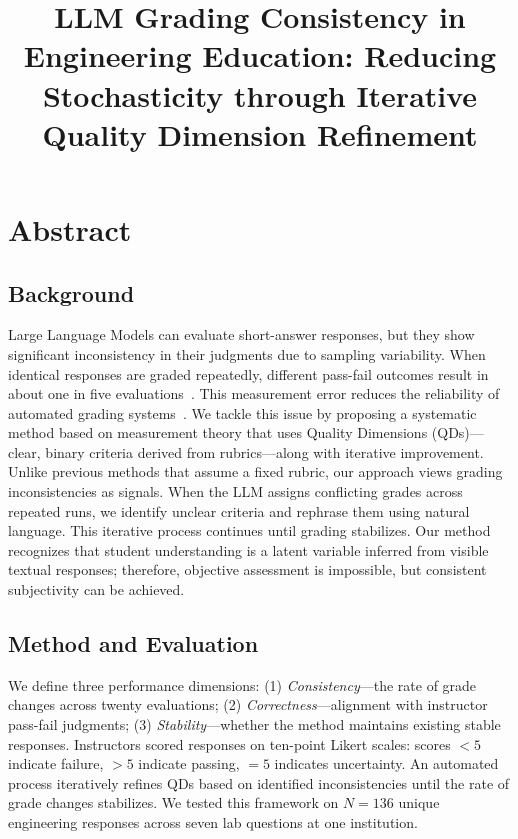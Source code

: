 \documentclass[11pt]{article}
\title{LLM Grading Consistency in Engineering Education: Reducing Stochasticity through Iterative Quality Dimension Refinement}
\author{}
\date{}
\begin{document}
\maketitle

\section*{Abstract}

\subsection*{Background}
Large Language Models can evaluate short-answer responses, but they show significant inconsistency in their judgments due to sampling variability. When identical responses are graded repeatedly, different pass-fail outcomes result in about one in five evaluations~\cite{zhang2024}. This measurement error reduces the reliability of automated grading systems~\cite{grevisse2024}. We tackle this issue by proposing a systematic method based on measurement theory that uses Quality Dimensions (QDs)---clear, binary criteria derived from rubrics---along with iterative improvement. Unlike previous methods that assume a fixed rubric, our approach views grading inconsistencies as signals. When the LLM assigns conflicting grades across repeated runs, we identify unclear criteria and rephrase them using natural language. This iterative process continues until grading stabilizes. Our method recognizes that student understanding is a latent variable inferred from visible textual responses; therefore, objective assessment is impossible, but consistent subjectivity can be achieved.

\subsection*{Method and Evaluation}
We define three performance dimensions: (1) \textit{Consistency}---the rate of grade changes across twenty evaluations; (2) \textit{Correctness}---alignment with instructor pass-fail judgments; (3) \textit{Stability}---whether the method maintains existing stable responses. Instructors scored responses on ten-point Likert scales: scores $< 5$ indicate failure, $> 5$ indicate passing, $= 5$ indicates uncertainty. An automated process iteratively refines QDs based on identified inconsistencies until the rate of grade changes stabilizes. We tested this framework on $N=136$ unique engineering responses across seven lab questions at one institution.
\end{document}
